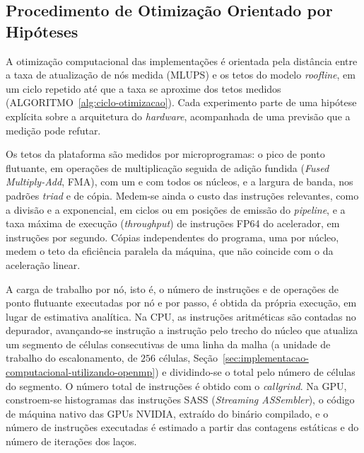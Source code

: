 \subsection{Procedimento de Otimização Orientado por Hipóteses}\label{subsec:procedimento-de-otimizacao}

A otimização computacional das implementações é orientada pela distância entre a taxa de atualização de nós medida (MLUPS) e os tetos do modelo \textit{roofline}, em um ciclo repetido até que a taxa se aproxime dos tetos medidos (ALGORITMO~\ref{alg:ciclo-otimizacao}).
Cada experimento parte de uma hipótese explícita sobre a arquitetura do \textit{hardware}, acompanhada de uma previsão que a medição pode refutar.

Os tetos da plataforma são medidos por microprogramas: o pico de ponto flutuante, em operações de multiplicação seguida de adição fundida (\textit{Fused Multiply-Add}, FMA), com um e com todos os núcleos, e a largura de banda, nos padrões \textit{triad} e de cópia.
Medem-se ainda o custo das instruções relevantes, como a divisão e a exponencial, em ciclos ou em posições de emissão do \textit{pipeline}, e a taxa máxima de execução (\textit{throughput}) de instruções FP64 do acelerador, em instruções por segundo.
Cópias independentes do programa, uma por núcleo, medem o teto da eficiência paralela da máquina, que não coincide com o da aceleração linear.

A carga de trabalho por nó, isto é, o número de instruções e de operações de ponto flutuante executadas por nó e por passo, é obtida da própria execução, em lugar de estimativa analítica.
Na CPU, as instruções aritméticas são contadas no depurador, avançando-se instrução a instrução pelo trecho do núcleo que atualiza um segmento de células consecutivas de uma linha da malha (a unidade de trabalho do escalonamento, de $256$ células, Seção~\ref{sec:implementacao-computacional-utilizando-openmp}) e dividindo-se o total pelo número de células do segmento.
O número total de instruções é obtido com o \textit{callgrind}.
Na GPU, constroem-se histogramas das instruções SASS (\textit{Streaming ASSembler}), o código de máquina nativo das GPUs NVIDIA, extraído do binário compilado, e o número de instruções executadas é estimado a partir das contagens estáticas e do número de iterações dos laços.

